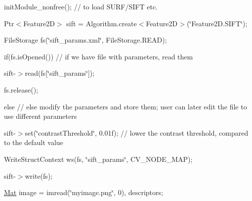 {\ttfamily init\+Module\+\_\+nonfree(); // to load S\+U\+R\+F/\+S\+I\+FT etc.}

{\ttfamily }

{\ttfamily }

{\ttfamily Ptr$<$\+Feature2\+D$>$ sift = Algorithm.\+create$<$\+Feature2\+D$>$(\char`\"{}\+Feature2\+D.\+S\+I\+F\+T\char`\"{});}

{\ttfamily }

{\ttfamily }

{\ttfamily File\+Storage fs(\char`\"{}sift\+\_\+params.\+xml\char`\"{}, File\+Storage.\+R\+E\+AD);}

{\ttfamily }

{\ttfamily }

{\ttfamily if(fs.\+is\+Opened()) // if we have file with parameters, read them}

{\ttfamily }

{\ttfamily }

{\ttfamily sift-\/$>$read(fs\mbox{[}\char`\"{}sift\+\_\+params\char`\"{}\mbox{]});}

{\ttfamily }

{\ttfamily }

{\ttfamily fs.\+release();}

{\ttfamily }

{\ttfamily }

{\ttfamily else // else modify the parameters and store them; user can later edit the file to use different parameters}

{\ttfamily }

{\ttfamily }

{\ttfamily sift-\/$>$set(\char`\"{}contrast\+Threshold\char`\"{}, 0.\+01f); // lower the contrast threshold, compared to the default value}

{\ttfamily }

{\ttfamily }

{\ttfamily Write\+Struct\+Context ws(fs, \char`\"{}sift\+\_\+params\char`\"{}, C\+V\+\_\+\+N\+O\+D\+E\+\_\+\+M\+AP);}

{\ttfamily }

{\ttfamily }

{\ttfamily sift-\/$>$write(fs);}

{\ttfamily }

{\ttfamily }

{\ttfamily \mbox{\hyperlink{classorg_1_1opencv_1_1core_1_1_mat}{Mat}} image = imread(\char`\"{}myimage.\+png\char`\"{}, 0), descriptors;}

{\ttfamily }

